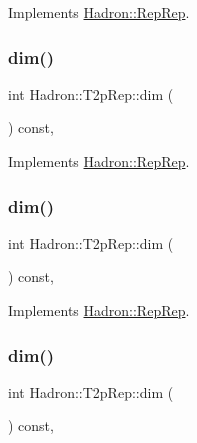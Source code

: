 Implements \mbox{\hyperlink{structHadron_1_1RepRep_a92c8802e5ed7afd7da43ccfd5b7cd92b}{Hadron\+::\+Rep\+Rep}}.

\mbox{\label{structHadron_1_1T2pRep_a7ececbae074c65b493f3bf73cf32c393}} 
\subsubsection{\texorpdfstring{dim()}{dim()}\hspace{0.1cm}{\footnotesize\ttfamily [3/5]}}
{\footnotesize\ttfamily int Hadron\+::\+T2p\+Rep\+::dim (\begin{DoxyParamCaption}{ }\end{DoxyParamCaption}) const\hspace{0.3cm}{\ttfamily [inline]}, {\ttfamily [virtual]}}



Implements \mbox{\hyperlink{structHadron_1_1RepRep_a92c8802e5ed7afd7da43ccfd5b7cd92b}{Hadron\+::\+Rep\+Rep}}.

\mbox{\label{structHadron_1_1T2pRep_a7ececbae074c65b493f3bf73cf32c393}} 
\subsubsection{\texorpdfstring{dim()}{dim()}\hspace{0.1cm}{\footnotesize\ttfamily [4/5]}}
{\footnotesize\ttfamily int Hadron\+::\+T2p\+Rep\+::dim (\begin{DoxyParamCaption}{ }\end{DoxyParamCaption}) const\hspace{0.3cm}{\ttfamily [inline]}, {\ttfamily [virtual]}}



Implements \mbox{\hyperlink{structHadron_1_1RepRep_a92c8802e5ed7afd7da43ccfd5b7cd92b}{Hadron\+::\+Rep\+Rep}}.

\mbox{\label{structHadron_1_1T2pRep_a7ececbae074c65b493f3bf73cf32c393}} 
\subsubsection{\texorpdfstring{dim()}{dim()}\hspace{0.1cm}{\footnotesize\ttfamily [5/5]}}
{\footnotesize\ttfamily int Hadron\+::\+T2p\+Rep\+::dim (\begin{DoxyParamCaption}{ }\end{DoxyParamCaption}) const\hspace{0.3cm}{\ttfamily [inline]}, {\ttfamily [virtual]}}



